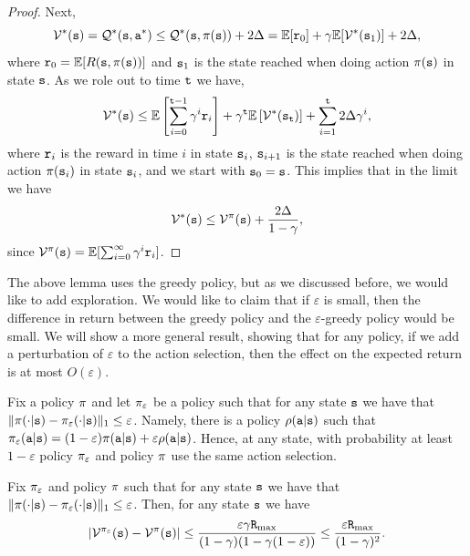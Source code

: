 \begin{advanced}
\begin{proof}
Next,
$$\mathcal{V}^*({\tt s})=\mathcal{Q}^*({\tt s},{\tt a}^*)\leq \mathcal{Q}^*({\tt s},\pi({\tt s}))+2\Delta = \mathbb{E}[{\tt r}_0]+\gamma
\mathbb{E}[\mathcal{V}^*({\tt s}_1)]+2\Delta,$$ where
${\tt r}_0=\mathbb{E}[R({\tt s},\pi({\tt s}))]$ and ${\tt s}_1$ is the state
reached when doing action $\pi({\tt s})$ in state ${\tt s}$. As we
role out to time ${\tt t}$ we have,
\[
\mathcal{V}^*({\tt s})\leq \mathbb{E}\left[\sum_{i=0}^{{\tt t}-1} \gamma^i
{\tt r}_i\right]+\gamma^{\tt t}
\mathbb{E}\left[\mathcal{V}^*({\tt s}_{\tt t})\right]+\sum_{i=1}^{\tt t} 2\Delta\gamma^i,
\]
where ${\tt r}_i$ is the reward in time $i$ in state ${\tt s}_i$,
${\tt s}_{i+1}$ is the state reached when doing action
$\pi({\tt s}_i)$ in state ${\tt s}_i$, and we start with
${\tt s}_0={\tt s}$.
%
This implies that in the limit we have
\[
\mathcal{V}^*({\tt s})\leq \mathcal{V}^\pi({\tt s})+\frac{
2\Delta}{1-\gamma},
\]
since $\mathcal{V}^\pi({\tt s})=\mathbb{E}[\sum_{i=0}^{\infty} \gamma^i
{\tt r}_i]$.
\end{proof}

The above lemma uses the greedy policy, but as we discussed before,
we would like to add exploration. We would like to claim that if
$\varepsilon$ is small, then the difference in return between the
greedy policy and the $\varepsilon$-greedy policy would be small. We
will show a more general result, showing that for any policy, if we
add a perturbation of $\varepsilon$ to the action selection, then
the effect on the expected return is at most $O(\varepsilon)$.

Fix a policy $\pi$ and let $\pi_\varepsilon$ be a policy
such that for any state ${\tt s}$ we have that
$\|\pi(\cdot|{\tt s})-\pi_\varepsilon(\cdot|{\tt s})\|_1\leq\varepsilon$.
Namely, there is a policy $\rho({\tt a}|{\tt s})$ such that
$\pi_\varepsilon({\tt a}|{\tt s})=(1-\varepsilon)\pi({\tt a}|{\tt s})+\varepsilon
\rho({\tt a}|{\tt s})$. Hence, at any state, with probability at
least $1-\varepsilon$ policy $\pi_\varepsilon$ and policy
$\pi$ use the same action selection.

\begin{lemma}
\label{lemma:epsilon-greedy}
%
Fix $\pi_\varepsilon$ and policy $\pi$ such that for any
state ${\tt s}$ we have that
$\|\pi(\cdot|{\tt s})-\pi_\varepsilon(\cdot|{\tt s})\|_1\leq\varepsilon$.
Then, for any state ${\tt s}$ we have
\[
|\mathcal{V}^{\pi_\varepsilon}({\tt s})-\mathcal{V}^\pi({\tt s})|\leq
\frac{\varepsilon\gamma{\tt R}_{\max }}{(1-\gamma)(1-\gamma(1-\varepsilon))}\leq \frac{\varepsilon{\tt R}_{\max }}{(1-\gamma)^2}.
\]
\end{lemma}


\end{advanced}
